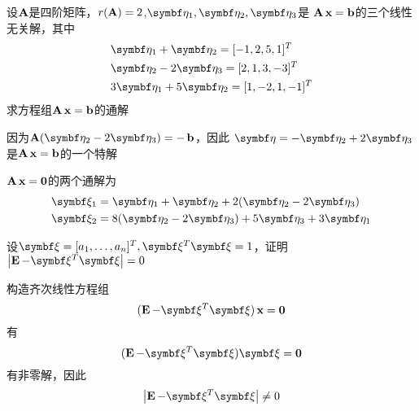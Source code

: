 \documentclass{article}
\begin{document}
\begin{examplle}[]
设\(\operatorname{\textbf{A}}\)是四阶矩阵，\(r(\operatorname{\textbf{A}})=2\),\(\boldeta_1,\boldeta_2,\boldeta_3\)是
\(\operatorname{\textbf{A}}\operatorname{\textbf{x}}=\operatorname{\textbf{b}}\)的三个线性无关解，其中
\begin{align*}
&\boldeta_1+\boldeta_2=[-1,2,5,1]^T\\
&\boldeta_2-2\boldeta_3=[2,1,3,-3]^T\\
&3\boldeta_1+5\boldeta_2=[1,-2,1,-1]^T
\end{align*}
求方程组\(\operatorname{\textbf{A}}\operatorname{\textbf{x}}=\operatorname{\textbf{b}}\)的通解

因为\(\bA(\boldeta_2-2\boldeta_3)=-\bb\)，因此
\(\boldeta=-\boldeta_2+2\boldeta_3\)是\(\operatorname{\textbf{A}}\operatorname{\textbf{x}}=\operatorname{\textbf{b}}\)的一个特解

\(\operatorname{\textbf{A}}\operatorname{\textbf{x}}=\mathbf{0}\)的两个通解为
\begin{align*}
&\bxi_1=\boldeta_1+\boldeta_2+2(\boldeta_2-2\boldeta_3)\\
&\bxi_2=8(\boldeta_2-2\boldeta_3)+5\boldeta_3+3\boldeta_1
\end{align*}
\end{examplle}

\begin{examplle}[]
设\(\bxi=[a_1,\dots,a_n]^T,\bxi^T\bxi=1\)，证明\(\abs{\bE-\bxi^T\bxi}=0\)

构造齐次线性方程组
\begin{equation*}
(\bE-\bxi^T\bxi)\bx=\bzero
\end{equation*}
有
\begin{equation*}
(\bE-\bxi^T\bxi)\bxi=\bzero
\end{equation*}
有非零解，因此
\begin{equation*}
\abs{\bE-\bxi^T\bxi}\neq0
\end{equation*}
\end{examplle}
\end{document}
